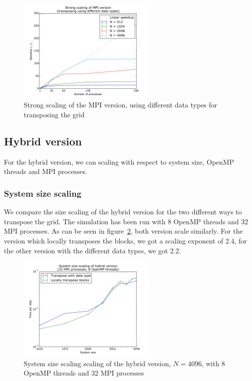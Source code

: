 \documentclass[a4paper]{article}
\begin{document}
\begin{figure}
	\centering
	\includegraphics[width=0.6\textwidth]{mpi_data_strong_scaling_vs_1proc.pdf}
	\caption{Strong scaling of the MPI version, using different data types for transposing the grid}
	\label{fig:mpi-strong-scaling-data}
\end{figure}


\subsection{Hybrid version}
For the hybrid version, we can scaling with respect to system size, OpenMP threads and MPI processes.

\subsubsection{System size scaling}
We compare the size scaling of the hybrid version for the two different ways to transpose the grid.
The simulation has been run with 8 OpenMP threads and 32 MPI processes.
As can be seen in figure~\ref{fig:hybrid-size-scaling}, both version scale similarly.
For the version which locally transposes the blocks, we got a scaling exponent of 2.4, for the other version with the different data types, we got 2.2.

\begin{figure}
	\centering
	\includegraphics[width=0.6\textwidth]{hybrid_size_scaling.pdf}
	\caption{System size scaling scaling of the hybrid version, $N=4096$, with 8 OpenMP threads and 32 MPI processes}
	\label{fig:hybrid-size-scaling}
\end{figure}
\end{document}
